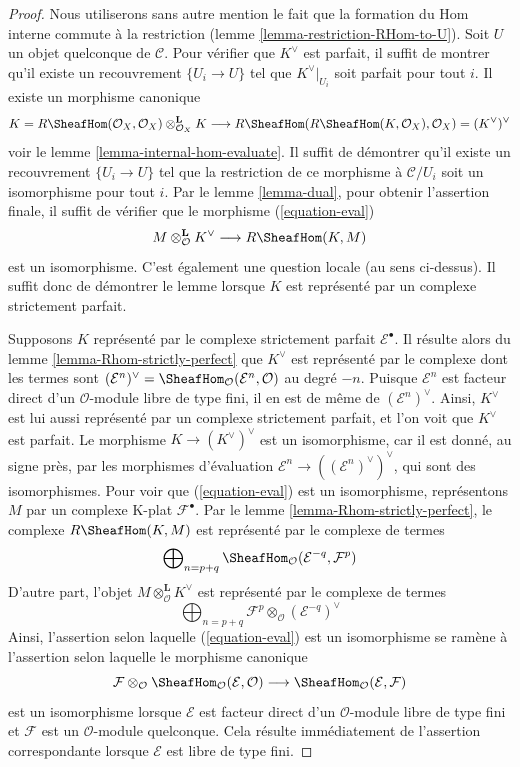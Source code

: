\begin{proof}
Nous utiliserons sans autre mention le fait que la formation du Hom interne
commute à la restriction (lemme \ref{lemma-restriction-RHom-to-U}). Soit $U$
un objet quelconque de $\mathcal{C}$. Pour vérifier que $K^\vee$ est parfait,
il suffit de montrer qu'il existe un recouvrement $\{U_i \to U\}$ tel que
$K^\vee|_{U_i}$ soit parfait pour tout $i$. Il existe un morphisme canonique
$$
K = R\SheafHom(\mathcal{O}_X, \mathcal{O}_X)
\otimes_{\mathcal{O}_X}^\mathbf{L} K \longrightarrow
R\SheafHom(R\SheafHom(K, \mathcal{O}_X), \mathcal{O}_X) =
(K^\vee)^\vee
$$
voir le lemme \ref{lemma-internal-hom-evaluate}. Il suffit de démontrer qu'il
existe un recouvrement $\{U_i \to U\}$ tel que la restriction de ce morphisme
à $\mathcal{C}/U_i$ soit un isomorphisme pour tout $i$. Par le lemme
\ref{lemma-dual}, pour obtenir l'assertion finale, il suffit de vérifier que
le morphisme (\ref{equation-eval})
$$
M \otimes^\mathbf{L}_\mathcal{O} K^\vee
\longrightarrow
R\SheafHom(K, M)
$$
est un isomorphisme. C'est également une question locale (au sens ci-dessus).
Il suffit donc de démontrer le lemme lorsque $K$ est représenté par un
complexe strictement parfait.

\medskip\noindent
Supposons $K$ représenté par le complexe strictement parfait
$\mathcal{E}^\bullet$. Il résulte alors du lemme
\ref{lemma-Rhom-strictly-perfect} que $K^\vee$ est représenté par le complexe
dont les termes sont
$(\mathcal{E}^n)^\vee =
\SheafHom_\mathcal{O}(\mathcal{E}^n, \mathcal{O})$
au degré $-n$. Puisque $\mathcal{E}^n$ est facteur direct d'un
$\mathcal{O}$-module libre de type fini, il en est de même de
$(\mathcal{E}^n)^\vee$. Ainsi, $K^\vee$ est lui aussi représenté par un
complexe strictement parfait, et l'on voit que $K^\vee$ est parfait. Le
morphisme $K \to (K^\vee)^\vee$ est un isomorphisme, car il est donné, au
signe près, par les morphismes d'évaluation
$\mathcal{E}^n \to ((\mathcal{E}^n)^\vee)^\vee$, qui sont des isomorphismes.
Pour voir que (\ref{equation-eval}) est un isomorphisme, représentons $M$ par
un complexe K-plat $\mathcal{F}^\bullet$. Par le lemme
\ref{lemma-Rhom-strictly-perfect}, le complexe $R\SheafHom(K, M)$ est
représenté par le complexe de termes
$$
\bigoplus\nolimits_{n = p + q}
\SheafHom_\mathcal{O}(\mathcal{E}^{-q}, \mathcal{F}^p)
$$
D'autre part, l'objet $M \otimes^\mathbf{L}_\mathcal{O} K^\vee$ est
représenté par le complexe de termes
$$
\bigoplus\nolimits_{n = p + q}
\mathcal{F}^p \otimes_\mathcal{O} (\mathcal{E}^{-q})^\vee
$$
Ainsi, l'assertion selon laquelle (\ref{equation-eval}) est un isomorphisme se
ramène à l'assertion selon laquelle le morphisme canonique
$$
\mathcal{F}
\otimes_\mathcal{O}
\SheafHom_\mathcal{O}(\mathcal{E}, \mathcal{O})
\longrightarrow
\SheafHom_\mathcal{O}(\mathcal{E}, \mathcal{F})
$$
est un isomorphisme lorsque $\mathcal{E}$ est facteur direct d'un
$\mathcal{O}$-module libre de type fini et $\mathcal{F}$ est un
$\mathcal{O}$-module quelconque. Cela résulte immédiatement de l'assertion
correspondante lorsque $\mathcal{E}$ est libre de type fini.
\end{proof}


